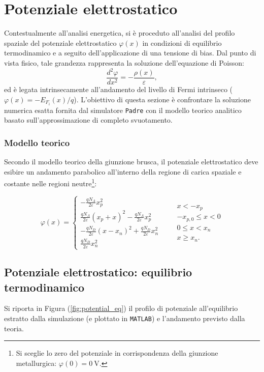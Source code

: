 \documentclass[a4paper,11pt]{report}
\begin{document}
\section{Potenziale elettrostatico}
Contestualmente all'analisi energetica, si è proceduto all'analisi del profilo spaziale del potenziale elettrostatico $\varphi(x)$ in condizioni di equilibrio termodinamico e a seguito dell'applicazione di una tensione di bias. Dal punto di vista fisico, tale grandezza rappresenta la soluzione dell'equazione di Poisson:
\begin{equation}
    \frac{d^2\varphi}{dx^2} = -\frac{\rho(x)}{\varepsilon},
\end{equation}
ed è legata intrinsecamente all'andamento del livello di Fermi intrinseco ($\varphi(x) = -E_{F_i}(x)/q$).
L'obiettivo di questa sezione è confrontare la soluzione numerica esatta fornita dal simulatore \texttt{Padre} con il modello teorico analitico basato sull'approssimazione di completo svuotamento.

\subsubsection{Modello teorico}
Secondo il modello teorico della giunzione brusca, il potenziale elettrostatico deve esibire un andamento parabolico all'interno della regione di carica spaziale e costante nelle regioni neutre\footnote{Si sceglie lo zero del potenziale in corrispondenza della giunzione metallurgica: $\varphi(0) = \SI{0}{\volt}$.}:

\begin{equation}
\varphi(x) = 
\begin{cases}
-\frac{qN_A}{2\varepsilon}x_{p}^2   \\
\frac{qN_A}{2\varepsilon}(x_{p}+x)^2 - \frac{qN_A}{2\varepsilon}x_{p}^2 \\
-\frac{qN_D}{2\varepsilon}(x-x_{n})^2 + \frac{qN_D}{2\varepsilon}x_{n}^2 \\
\frac{qN_D}{2\varepsilon}x_{n}^2
\end{cases}
\quad
\begin{aligned}
&x < -x_{p} \\
&-x_{p,0} \leq x < 0 \\
&0 \leq x < x_{n} \\
&x \geq x_{n}. 
\end{aligned}
\label{eq:profilo_pot}
\end{equation}

\subsection{Potenziale elettrostatico: equilibrio termodinamico}
Si riporta in Figura (\ref{fig:potential_eq}) il profilo di potenziale all'equilibrio estratto dalla simulazione (e plottato in \texttt{MATLAB}) e l'andamento previsto dalla teoria.
\end{document}
